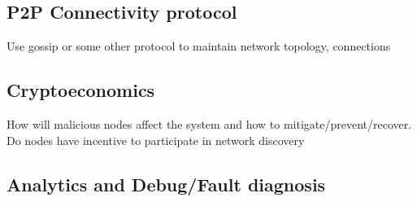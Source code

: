 \subsection{P2P Connectivity protocol}
Use gossip or some other protocol to maintain network topology, connections

\subsection{Cryptoeconomics}
How will malicious nodes affect the system and how to mitigate/prevent/recover. Do nodes have incentive to participate in network discovery

\subsection{Analytics and Debug/Fault diagnosis}
